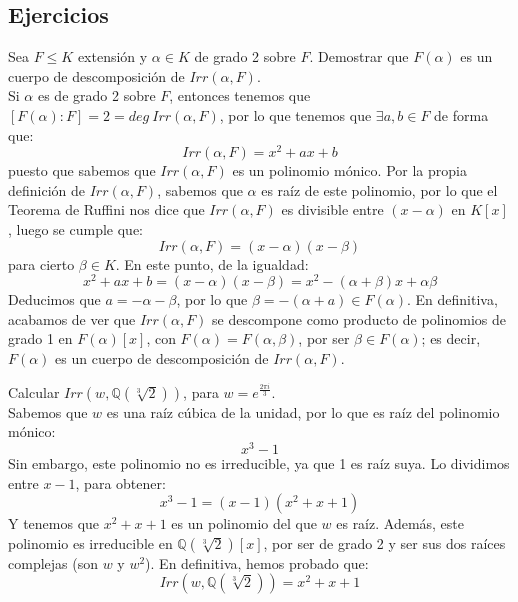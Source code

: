 \subsection{Ejercicios}

\begin{ejercicio}
    Sea $F\leq K$ extensión y $\alpha\in K$ de grado 2 sobre $F$. Demostrar que $F(\alpha)$ es un cuerpo de descomposición de $Irr(\alpha,F)$.\\

    \noindent
    Si $\alpha$ es de grado 2 sobre $F$, entonces tenemos que $[F(\alpha):F] = 2 = deg~Irr(\alpha,F)$, por lo que tenemos que $\exists a,b\in F$ de forma que:
    \begin{equation*}
        Irr(\alpha,F) = x^2+ax+b
    \end{equation*}
    puesto que sabemos que $Irr(\alpha,F)$ es un polinomio mónico. Por la propia definición de $Irr(\alpha,F)$, sabemos que $\alpha$ es raíz de este polinomio, por lo que el Teorema de Ruffini nos dice que $Irr(\alpha,F)$ es divisible entre $(x-\alpha)$ en $K[x]$, luego se cumple que:
    \begin{equation*}
        Irr(\alpha,F) = (x-\alpha)(x-\beta)
    \end{equation*}
    para cierto $\beta\in K$. En este punto, de la igualdad:
    \begin{equation*}
        x^2+ax+b = (x-\alpha)(x-\beta) = x^2-(\alpha+\beta)x + \alpha\beta
    \end{equation*}
    Deducimos que $a=-\alpha-\beta$, por lo que $\beta=-(\alpha+a)\in F(\alpha)$. En definitiva, acabamos de ver que $Irr(\alpha,F)$ se descompone como producto de polinomios de grado 1 en $F(\alpha)[x]$, con $F(\alpha) = F(\alpha,\beta)$, por ser $\beta\in F(\alpha)$; es decir, $F(\alpha)$ es un cuerpo de descomposición de $Irr(\alpha,F)$.
\end{ejercicio}

\begin{ejercicio}
    Calcular $Irr(w,\mathbb{Q}(\sqrt[3]{2}))$, para $w=e^{\frac{2\pi i}{3}}$.\\

    \noindent
    Sabemos que $w$ es una raíz cúbica de la unidad, por lo que es raíz del polinomio mónico:
    \begin{equation*}
        x^3-1
    \end{equation*}
    Sin embargo, este polinomio no es irreducible, ya que 1 es raíz suya. Lo dividimos entre $x-1$, para obtener:
    \begin{equation*}
        x^3-1 = (x-1)(x^2+x+1)
    \end{equation*}
    Y tenemos que $x^2+x+1$ es un polinomio del que $w$ es raíz. Además, este polinomio es irreducible en $\mathbb{Q}(\sqrt[3]{2})[x]$, por ser de grado 2 y ser sus dos raíces complejas (son $w$ y $w^2$). En definitiva, hemos probado que:
    \begin{equation*}
        Irr(w,\mathbb{Q}(\sqrt[3]{2})) = x^2+x+1
    \end{equation*}
\end{ejercicio}

